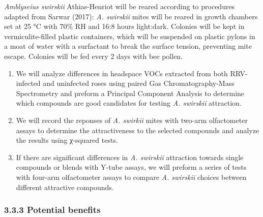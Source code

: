 \documentclass[12pt,final,CPage]{ufthesis}
\begin{document}
{  \emph{Amblyseius swirskii} Athias-Henriot will be reared according to procedures adapted from Sarwar (2017): \emph{A. swirskii} mites will be reared in growth chambers set at 25 °C with 70\% RH and 16:8 hours light:dark. Colonies will be kept in vermiculite-filled plastic containers, which will be suspended on plastic pylons in a moat of water with a surfactant to break the surface tension, preventing mite escape. Colonies will be fed every 2 days with bee pollen.
  \begin{enumerate}
  \def\labelenumi{\arabic{enumi}.}
  \item
    We will analyze differences in headspace VOCs extracted from both RRV-infected and uninfected roses using paired Gas Chromatography-Mass Spectrometry and preform a Principal Component Analysis to determine which compounds are good candidates for testing \emph{A. swirskii} attraction.
  \item
    We will record the reponses of \emph{A. swirkii} mites with two-arm olfactometer assays to determine the attractiveness to the selected compounds and analyze the results using χ-squared tests.
  \item
    If there are significant differences in \emph{A. swirskii} attraction towards single compounds or blends with Y-tube assays, we will preform a series of tests with four-arm olfactometer assays to compare \emph{A. swirskii} choices between different attractive compounds.
  \end{enumerate}
  \hypertarget{potential-benefits-1}{%
  \subsubsection{3.3.3 Potential benefits}\label{potential-benefits-1}}

}
\end{document}
